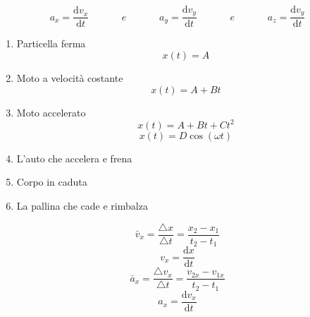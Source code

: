 \documentclass{article}
\newcommand\mathspace{\;\;\;\;\;\;\;\;\;\;\;\; e \;\;\;\;\;\;\;\;\;\;\;\;}
\begin{document}
			\begin{equation}
				a_x = \frac{ \mathrm d v_x }{ \mathrm d t } \mathspace
				a_y = \frac{ \mathrm d v_y }{ \mathrm d t } \mathspace
				a_z = \frac{ \mathrm d v_y }{ \mathrm d t }
			\end{equation}
			\begin{enumerate}
				\item Particella ferma
					\begin{equation} x(t) = A \end{equation}
				\item Moto a velocità costante
					\begin{equation} x(t) = A + B t \end{equation}
				\item Moto accelerato
					\begin{equation} x(t) = A + B t + C t^2 \end{equation}
					\begin{equation} x(t) = D \cos ( \omega t ) \end{equation}
				\item L'auto che accelera e frena
				\item Corpo in caduta
				\item La pallina che cade e rimbalza
			\end{enumerate}
			\begin{equation} \bar v_x = \frac{ \triangle x }{ \triangle t } = \frac{ x_2 - x_1 }{ t_2 - t_1 } \end{equation}
			\begin{equation} v_x = \frac{ \mathrm d x }{ \mathrm d t } \end{equation}
			\begin{equation} \bar a_x = \frac{ \triangle v_x }{ \triangle t } = \frac{ v_{2x} - v_{1x} }{ t_2 - t_1 } \end{equation}
			\begin{equation} a_x = \frac{ \mathrm d v_x }{ \mathrm d t} \end{equation}

\begin{comment}
			\begin{equation}  \end{equation}
			\begin{equation}  \end{equation}
			\begin{equation}  \end{equation}
\end{comment}
\end{document}
